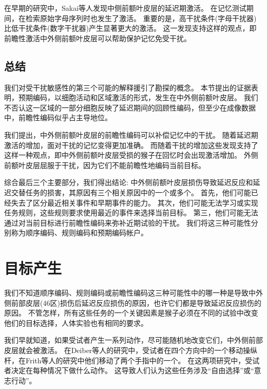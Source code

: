 在早期的研究中，Sakai等人\cite{sakai2002parahippocampal}发现中侧前额叶皮层的延迟期激活。
在记忆测试期间，在检索原始字母序列时也发生了激活。
重要的是，高干扰条件(字母干扰器)比低干扰条件(数字干扰器)产生显著更大的激活。
这一发现支持这样的观点，即前瞻性激活中外侧前额叶皮层可以帮助保护记忆免受干扰。



\subsection{总结}

我们对受干扰敏感性的第三个可能的解释援引了勘探的概念。
本节提出的证据表明，预期编码，以细胞活动和区域激活的形式，发生在中外侧前额叶皮层。
我们不否认这一区域的一部分细胞反映了延迟期间的回顾性编码，但至少在成像数据中，前瞻性编码似乎占主导地位。


我们提出，中外侧前额叶皮层的前瞻性编码可以补偿记忆中的干扰。
随着延迟期激活的增加，面对干扰的记忆变得更加准确。
而随着干扰的增加这些发现支持了这样一种观点，即中外侧前额叶皮层受损的猴子在回忆时会出现激活增加。
外侧前额叶皮层屈服于干扰，因为它们不能前瞻性地编码当前目标。


综合最后三个主要部分，我们得出结论: 中外侧前额叶皮层损伤导致延迟反应和延迟交替任务的损害，其原因有三个相关原因中的一个或多个。
首先，他们可能已经失去了区分最近相关事件和早期事件的能力。
其次，他们可能无法学习或实现任务规则，这些规则要求使用最近的事件来选择当前目标。
第三，他们可能无法通过对当前目标进行前瞻性编码来弥补近期试验的干扰。
我们将这三种可能性分别称为顺序编码、规则编码和预期编码帐户。



\section{目标产生}

我们不知道顺序编码、规则编码或前瞻性编码这三种可能性中的哪一种是导致中外侧前部皮层(46区)损伤后延迟反应损伤的原因，也许它们都是导致延迟反应损伤的原因。
不管怎样，所有这些任务的一个关键因素是猴子必须在不同的试验中改变他们的目标选择，人体实验也有相同的要求。


我们早就知道，如果受试者产生一系列动作，尽可能随机地改变它们，中外侧前部皮层就会被激活。
在Deiber等人的研究中\cite{deiber1991cortical}，受试者在四个方向中的一个移动操纵杆，在Frith等人的研究中\cite{frith1991willed}他们移动了两个手指中的一个。
在这两项研究中，受试者决定在每种情况下做什么动作。
这导致人们认为这些任务涉及“自由选择”\cite{playford1992impaired}或“意志行动”\cite{frith1991willed}。



